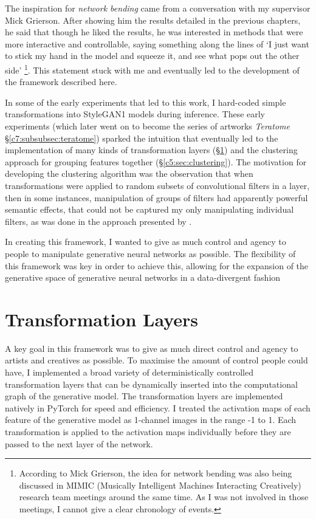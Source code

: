 The inspiration for \textit{network bending} came from a conversation with my supervisor Mick Grierson.
After showing him the results detailed in the previous chapters, he said that though he liked the results, he was interested in methods that were more interactive and controllable, saying something along the lines of `I just want to stick my hand in the model and squeeze it, and see what pops out the other side' \citep{grierson2020personal}\footnote{According to Mick Grierson, the idea for network bending was also being discussed in MIMIC (Musically Intelligent Machines Interacting Creatively) research team meetings around the same time. As I was not involved in those meetings, I cannot give a clear chronology of events.}. 
This statement stuck with me and eventually led to the development of the framework described here.

In some of the early experiments that led to this work, I hard-coded simple transformations into StyleGAN1 \citep{karras2019style} models during inference.
These early experiments (which later went on to become the series of artworks \textit{Teratome} \S \ref{c7:subsubsec:teratome}) sparked the intuition that eventually led to the implementation of many kinds of transformation layers (\S \ref{c5:sec:transforms}) and the clustering approach for grouping features together (\S \ref{c5:sec:clustering}).
The motivation for developing the clustering algorithm was the observation that when transformations were applied to random subsets of convolutional filters in a layer, then in some instances, manipulation of groups of filters had apparently powerful semantic effects, that could not be captured my only manipulating individual filters, as was done in the approach presented by \citep{bau2019semantic}.

In creating this framework, I wanted to give as much control and agency to people to manipulate generative neural networks as possible. 
The flexibility of this framework was key in order to achieve this, allowing for the expansion of the generative space of generative neural networks in a data-divergent fashion

\section{Transformation Layers}

\label{c5:sec:transforms}

A key goal in this framework was to give as much direct control and agency to artists and creatives as possible.
To maximise the amount of control people could have, I implemented a broad variety of deterministically controlled transformation layers that can be dynamically inserted into the computational graph of the generative model. 
The transformation layers are implemented natively in PyTorch \citep{paszke2019pytorch} for speed and efficiency. I
 treated the activation maps of each feature of the generative model as 1-channel images in the range -1 to 1. 
 Each transformation is applied to the activation maps individually before they are passed to the next layer of the network. 

